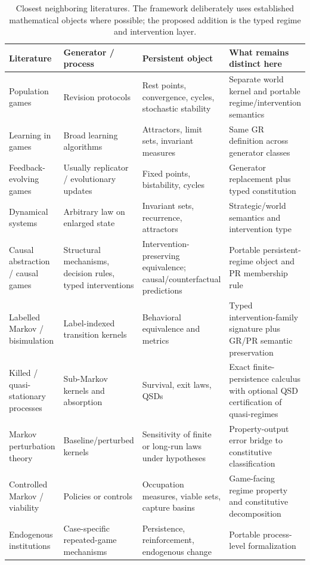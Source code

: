 \documentclass[10pt]{article}
\begin{document}
\begin{table}[htbp]
\centering
\footnotesize
\caption{Closest neighboring literatures. The framework deliberately uses established mathematical objects where possible; the proposed addition is the typed regime and intervention layer.}
\label{tab:literature-neighbors}
\begin{tabularx}{\textwidth}{@{}>{\raggedright\arraybackslash}p{}>{\raggedright\arraybackslash}p{}>{\raggedright\arraybackslash}p{}>{\raggedright\arraybackslash}X@{}}
\toprule
\textbf{Literature} & \textbf{Generator / process} & \textbf{Persistent object} & \textbf{What remains distinct here}\\
\midrule
Population games & Revision protocols & Rest points, convergence, cycles, stochastic stability & Separate world kernel and portable regime/intervention semantics\\
Learning in games & Broad learning algorithms & Attractors, limit sets, invariant measures & Same GR definition across generator classes\\
Feedback-evolving games & Usually replicator / evolutionary updates & Fixed points, bistability, cycles & Generator replacement plus typed constitution\\
Dynamical systems & Arbitrary law on enlarged state & Invariant sets, recurrence, attractors & Strategic/world semantics and intervention type\\
Causal abstraction / causal games & Structural mechanisms, decision rules, typed interventions & Intervention-preserving equivalence; causal/counterfactual predictions & Portable persistent-regime object and PR membership rule\\
Labelled Markov / bisimulation & Label-indexed transition kernels & Behavioral equivalence and metrics & Typed intervention-family signature plus GR/PR semantic preservation\\
Killed / quasi-stationary processes & Sub-Markov kernels and absorption & Survival, exit laws, QSDs & Exact finite-persistence calculus with optional QSD certification of quasi-regimes\\
Markov perturbation theory & Baseline/perturbed kernels & Sensitivity of finite or long-run laws under hypotheses & Property-output error bridge to constitutive classification\\
Controlled Markov / viability & Policies or controls & Occupation measures, viable sets, capture basins & Game-facing regime property and constitutive decomposition\\
Endogenous institutions & Case-specific repeated-game mechanisms & Persistence, reinforcement, endogenous change & Portable process-level formalization\\
\bottomrule
\end{tabularx}
\end{table}
\end{document}
